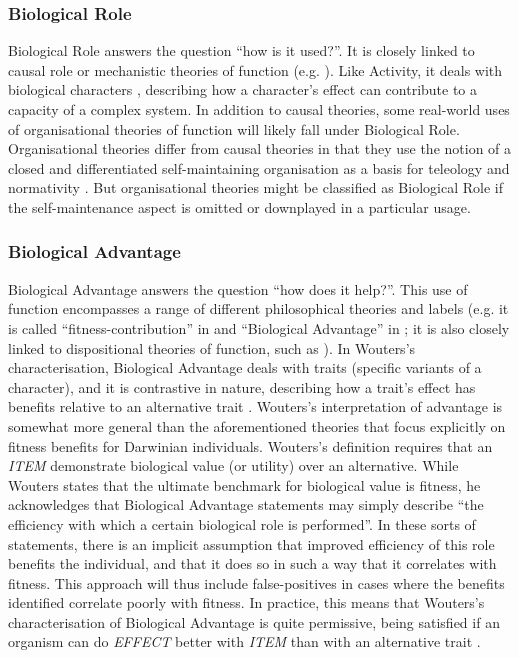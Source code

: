 \documentclass{article}
\begin{document}
\subsubsection{Biological Role}
\label{sec:biological-role}

Biological Role answers the question ``how is it used?''.
It is closely linked to causal role or mechanistic theories of function (e.g. \cite{cummins1975}).
Like Activity, it deals with biological characters \cite{wouters2003}, describing how a character's effect can contribute to a capacity of a complex system.
In addition to causal theories, some real-world uses of organisational theories of function will likely fall under Biological Role.
Organisational theories differ from causal theories in that they use the notion of a closed and differentiated self-maintaining organisation as a basis for teleology and normativity \cite{mossio2009}.
But organisational theories might be classified as Biological Role if the self-maintenance aspect is omitted or downplayed in a particular usage.

\subsubsection{Biological Advantage}
\label{sec:biological-advantage}

Biological Advantage answers the question ``how does it help?''.
This use of function encompasses a range of different philosophical theories and labels (e.g. it is called ``fitness-contribution'' in \cite{garson2016} and ``Biological Advantage'' in \cite{wouters2003}; it is also closely linked to dispositional theories of function, such as \cite{bigelow1987}).
In Wouters's characterisation, Biological Advantage deals with traits (specific variants of a character), and it is contrastive in nature, describing how a trait's effect has benefits relative to an alternative trait \cite{wouters2003}.
Wouters's interpretation of advantage is somewhat more general than the aforementioned theories that focus explicitly on fitness benefits for Darwinian individuals.
Wouters's definition requires that an \emph{ITEM} demonstrate biological value (or utility) over an alternative.
While Wouters states that the ultimate benchmark for biological value is fitness, he acknowledges that Biological Advantage statements may simply describe ``the efficiency with which a certain biological role is performed''.
In these sorts of statements, there is an implicit assumption that improved efficiency of this role benefits the individual, and that it does so in such a way that it correlates with fitness.
This approach will thus include false-positives in cases where the benefits identified correlate poorly with fitness.
In practice, this means that Wouters's characterisation of Biological Advantage is quite permissive, being satisfied if an organism can do \emph{EFFECT} better with \emph{ITEM} than with an alternative trait \cite{bigelow1987} .
\end{document}
